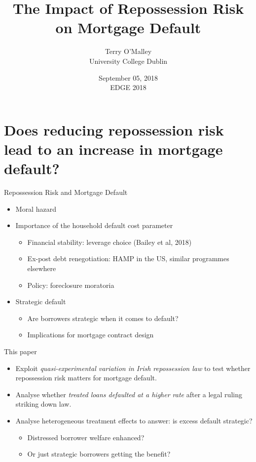 \documentclass[ignorenonframetext,aspectratio=169]{beamer}
\title{The Impact of Repossession Risk on Mortgage Default\\}
\author{Terry O'Malley\\[2\baselineskip]University College Dublin}
\date{September 05, 2018\\
EDGE 2018}
\providecommand{\tightlist}{%
  \setlength{\itemsep}{0pt}\setlength{\parskip}{0pt}}
\begin{document}
\frame{\titlepage}

\section{Does reducing repossession risk lead to an increase in mortgage
default?}\label{does-reducing-repossession-risk-lead-to-an-increase-in-mortgage-default}

\begin{frame}{Repossession Risk and Mortgage Default}

\begin{itemize}
\tightlist
\item
  Moral hazard
\end{itemize}

\begin{itemize}
\tightlist
\item
  Importance of the household default cost parameter

  \begin{itemize}
  \tightlist
  \item
    Financial stability: leverage choice (Bailey et al, 2018)
  \item
    Ex-post debt renegotiation: HAMP in the US, similar programmes
    elsewhere
  \item
    Policy: foreclosure moratoria
  \end{itemize}
\item
  Strategic default

  \begin{itemize}
  \tightlist
  \item
    Are borrowers strategic when it comes to default?
  \item
    Implications for mortgage contract design
  \end{itemize}
\end{itemize}

\end{frame}

\begin{frame}{This paper}

\begin{itemize}
\item
  Exploit \emph{quasi-experimental variation in Irish repossession law}
  to test whether repossession risk matters for mortgage default.
\item
  Analyse whether \emph{treated loans defaulted at a higher rate} after
  a legal ruling striking down law.
\item
  Analyse heterogeneous treatment effects to answer: is excess default
  strategic?

  \begin{itemize}
  \tightlist
  \item
    Distressed borrower welfare enhanced?
  \item
    Or just strategic borrowers getting the benefit?
  \end{itemize}
\end{itemize}

\end{frame}
\end{document}
